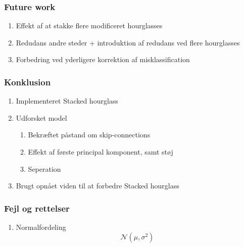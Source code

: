 \documentclass{beamer}
\begin{document}
\begin{frame}
    \frametitle{Future work}
    \begin{enumerate}
        \item<1-> Effekt af at stakke flere modificeret hourglasses
        \item<2-> Redudans andre steder + introduktion af redudans ved flere hourglasses
        \item<3-> Forbedring ved yderligere korrektion af misklassification
    \end{enumerate}
\end{frame}

\begin{frame}
    \frametitle{Konklusion}
    \begin{enumerate}
        \item<1-> Implementeret Stacked hourglass
        \item<2-> Udforsket model
        \begin{enumerate}
            \item Bekræftet påstand om skip-connections
            \item Effekt af første principal komponent, samt støj
            \item Seperation
        \end{enumerate}
        \item<3-> Brugt opnået viden til at forbedre Stacked hourglass
    \end{enumerate}
\end{frame}

\begin{frame}
    \frametitle{Fejl og rettelser}
    \begin{enumerate}
        \item<1-> Normalfordeling
        $$\mathcal{N} \left(\mu,  \sigma^2\right)$$
    \end{enumerate}
\end{frame}
\end{document}
